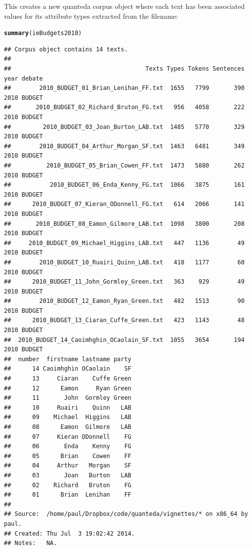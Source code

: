 \documentclass[11pt]{article}\usepackage[]{graphicx}\usepackage[]{color}
\makeatletter
\newcommand{\hlstd}[1]{\textcolor[rgb]{0.345,0.345,0.345}{#1}}%
\newcommand{\hlkwd}[1]{\textcolor[rgb]{0.737,0.353,0.396}{\textbf{#1}}}%
\newenvironment{kframe}{%
 \def\at@end@of@kframe{}%
 \ifinner\ifhmode%
  \def\at@end@of@kframe{\end{minipage}}%
  \begin{minipage}{\columnwidth}%
 \fi\fi%
 \def\FrameCommand##1{\hskip\@totalleftmargin \hskip-\fboxsep
 \colorbox{shadecolor}{##1}\hskip-\fboxsep
     \hskip-\linewidth \hskip-\@totalleftmargin \hskip\columnwidth}%
 \MakeFramed {\advance\hsize-\width
   \@totalleftmargin\z@ \linewidth\hsize
   \@setminipage}}%
 {\par\unskip\endMakeFramed%
 \at@end@of@kframe}
\newenvironment{knitrout}{}{} %
\makeatother
\begin{document}
This creates a new quanteda corpus object where each text has been associated values for its attribute types extracted from the filename:

\begin{knitrout}\footnotesize
{}\color{fgcolor}\begin{kframe}
\begin{alltt}
\hlkwd{summary}\hlstd{(ieBudgets2010)}
\end{alltt}
\begin{verbatim}
## Corpus object contains 14 texts.
## 
##                                      Texts Types Tokens Sentences year debate
##        2010_BUDGET_01_Brian_Lenihan_FF.txt  1655   7799       390 2010 BUDGET
##       2010_BUDGET_02_Richard_Bruton_FG.txt   956   4058       222 2010 BUDGET
##         2010_BUDGET_03_Joan_Burton_LAB.txt  1485   5770       329 2010 BUDGET
##        2010_BUDGET_04_Arthur_Morgan_SF.txt  1463   6481       349 2010 BUDGET
##          2010_BUDGET_05_Brian_Cowen_FF.txt  1473   5880       262 2010 BUDGET
##           2010_BUDGET_06_Enda_Kenny_FG.txt  1066   3875       161 2010 BUDGET
##      2010_BUDGET_07_Kieran_ODonnell_FG.txt   614   2066       141 2010 BUDGET
##       2010_BUDGET_08_Eamon_Gilmore_LAB.txt  1098   3800       208 2010 BUDGET
##     2010_BUDGET_09_Michael_Higgins_LAB.txt   447   1136        49 2010 BUDGET
##        2010_BUDGET_10_Ruairi_Quinn_LAB.txt   418   1177        60 2010 BUDGET
##      2010_BUDGET_11_John_Gormley_Green.txt   363    929        49 2010 BUDGET
##        2010_BUDGET_12_Eamon_Ryan_Green.txt   482   1513        90 2010 BUDGET
##      2010_BUDGET_13_Ciaran_Cuffe_Green.txt   423   1143        48 2010 BUDGET
##  2010_BUDGET_14_Caoimhghin_OCaolain_SF.txt  1055   3654       194 2010 BUDGET
##  number  firstname lastname party
##      14 Caoimhghin OCaolain    SF
##      13     Ciaran    Cuffe Green
##      12      Eamon     Ryan Green
##      11       John  Gormley Green
##      10     Ruairi    Quinn   LAB
##      09    Michael  Higgins   LAB
##      08      Eamon  Gilmore   LAB
##      07     Kieran ODonnell    FG
##      06       Enda    Kenny    FG
##      05      Brian    Cowen    FF
##      04     Arthur   Morgan    SF
##      03       Joan   Burton   LAB
##      02    Richard   Bruton    FG
##      01      Brian  Lenihan    FF
## 
## Source:  /home/paul/Dropbox/code/quanteda/vignettes/* on x86_64 by paul.
## Created: Thu Jul  3 19:02:42 2014.
## Notes:   NA.
\end{verbatim}
\end{kframe}
\end{knitrout}
\end{document}
